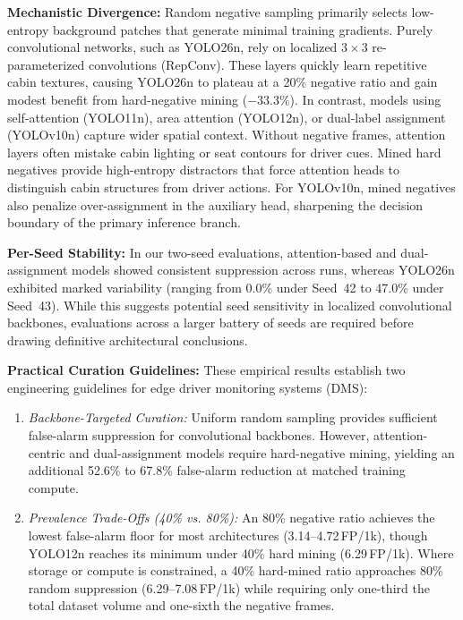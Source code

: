 \documentclass[conference]{IEEEtran}
\begin{document}
\textbf{Mechanistic Divergence:} Random negative sampling primarily selects low-entropy background patches that generate minimal training gradients. Purely convolutional networks, such as YOLO26n, rely on localized $3 \times 3$ re-parameterized convolutions (RepConv). These layers quickly learn repetitive cabin textures, causing YOLO26n to plateau at a 20\% negative ratio and gain modest benefit from hard-negative mining ($-33.3\%$). In contrast, models using self-attention (YOLO11n), area attention (YOLO12n), or dual-label assignment (YOLOv10n) capture wider spatial context. Without negative frames, attention layers often mistake cabin lighting or seat contours for driver cues. Mined hard negatives provide high-entropy distractors that force attention heads to distinguish cabin structures from driver actions. For YOLOv10n, mined negatives also penalize over-assignment in the auxiliary head, sharpening the decision boundary of the primary inference branch.

\textbf{Per-Seed Stability:} In our two-seed evaluations, attention-based and dual-assignment models showed consistent suppression across runs, whereas YOLO26n exhibited marked variability (ranging from 0.0\% under Seed~42 to 47.0\% under Seed~43). While this suggests potential seed sensitivity in localized convolutional backbones, evaluations across a larger battery of seeds are required before drawing definitive architectural conclusions.

\textbf{Practical Curation Guidelines:} These empirical results establish two engineering guidelines for edge driver monitoring systems (DMS):
\begin{enumerate}
    \item \textit{Backbone-Targeted Curation:} Uniform random sampling provides sufficient false-alarm suppression for convolutional backbones. However, attention-centric and dual-assignment models require hard-negative mining, yielding an additional 52.6\% to 67.8\% false-alarm reduction at matched training compute.
    \item \textit{Prevalence Trade-Offs (40\% vs. 80\%):} An 80\% negative ratio achieves the lowest false-alarm floor for most architectures (3.14--4.72\,FP/1k), though YOLO12n reaches its minimum under 40\% hard mining (6.29\,FP/1k). Where storage or compute is constrained, a 40\% hard-mined ratio approaches 80\% random suppression (6.29--7.08\,FP/1k) while requiring only one-third the total dataset volume and one-sixth the negative frames.
\end{enumerate}
\end{document}
